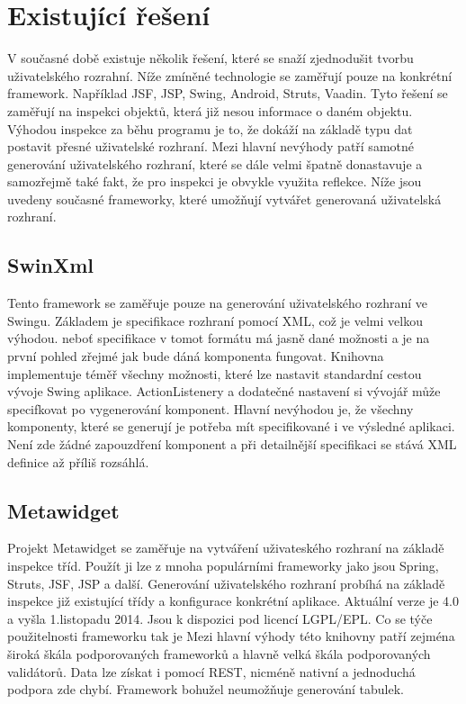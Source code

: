 \section{Existující řešení}
V současné době existuje několik řešení, které se snaží zjednodušit tvorbu uživatelského rozrahní. Níže zmíněné technologie se zaměřují pouze na konkrétní framework. Například JSF, JSP,  Swing, Android, Struts, Vaadin. Tyto řešení se zaměřují na inspekci objektů, která již nesou informace o daném objektu. Výhodou inspekce za běhu programu je to, že dokáží na základě typu dat postavit přesné uživatelské rozhraní. Mezi hlavní nevýhody patří samotné generování uživatelského rozhraní, které se dále velmi špatně donastavuje a samozřejmě také fakt, že pro inspekci je obvykle využita reflekce. Níže jsou uvedeny současné frameworky, které umožňují vytvářet generovaná uživatelská rozhraní.
\subsection{SwinXml}
Tento framework se zaměřuje pouze na generování uživatelského rozhraní ve Swingu. Základem je specifikace rozhraní pomocí XML, což je velmi velkou výhodou. neboť specifikace v tomot formátu má jasně dané možnosti a je na první pohled zřejmé jak bude dáná komponenta fungovat. Knihovna implementuje téměř všechny možnosti, které lze nastavit standardní cestou vývoje Swing aplikace. ActionListenery a dodatečné nastavení si vývojář může specifkovat po vygenerování komponent. Hlavní nevýhodou je, že všechny komponenty, které se generují je potřeba mít specifikované i ve výsledné aplikaci. Není zde žádné zapouzdření komponent a při detailnější specifikaci se stává XML definice až příliš rozsáhlá.
\subsection{Metawidget}
Projekt Metawidget se zaměřuje na vytváření uživateského rozhraní na základě inspekce tříd. Použít ji lze z mnoha populárními frameworky jako jsou Spring, Struts, JSF, JSP a další. Generování uživatelského rozhraní probíhá na základě inspekce již existující třídy a konfigurace konkrétní aplikace. Aktuální verze je 4.0 a vyšla 1.listopadu 2014. Jsou k dispozici pod licencí LGPL/EPL. Co se týče použitelnosti frameworku tak je Mezi hlavní výhody této knihovny patří zejména široká škála podporovaných frameworků a hlavně velká škála podporovaných validátorů. Data lze získat i pomocí REST, nicméně nativní a jednoduchá podpora zde chybí. Framework bohužel neumožňuje generování tabulek.

